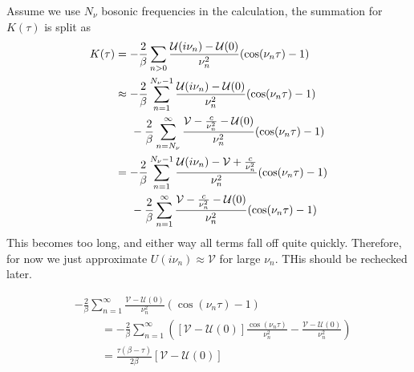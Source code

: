 \documentclass[12pt,a4paper]{scrartcl}
\numberwithin{equation}{section}
\begin{document}
Assume we use $N_{\nu}$ bosonic frequencies in the calculation, the summation for $K(\tau)$ is split as
\begin{align}
K(\tau) &= -\frac{2}{\beta} \sum_{n>0} \frac{\mathcal{U}(i\nu_n)-\mathcal{U}(0)}{\nu^2_n}
                                        ( \cos(\nu_n\tau)-1 ) \\
%
&\approx -\frac{2}{\beta} \sum_{n=1}^{N_{\nu}-1} \frac{\mathcal{U}(i\nu_n)-\mathcal{U}(0)}{\nu^2_n}
                                        ( \cos(\nu_n\tau)-1 ) \nonumber \\
    &\hspace{0.5cm}-\frac{2}{\beta} \sum_{n=N_{\nu}}^{\infty} \frac{\mathcal{V} - \frac{c}{\nu_n^2}-\mathcal{U}(0)}{\nu^2_n}
                                        ( \cos(\nu_n\tau)-1 ) \\
%                                        
&= -\frac{2}{\beta} \sum_{n=1}^{N_{\nu}-1} \frac{\mathcal{U}(i\nu_n)-\mathcal{V}+\frac{c}{\nu_n^2}}{\nu^2_n}
                                        ( \cos(\nu_n\tau)-1 ) \nonumber \\
    &\hspace{0.5cm}-\frac{2}{\beta} \sum_{n=1}^{\infty} \frac{\mathcal{V} - \frac{c}{\nu_n^2}-\mathcal{U}(0)}{\nu^2_n}
                                        ( \cos(\nu_n\tau)-1 ) \label{eq:k_hf_sum_last}
\end{align}
This becomes too long, and either way all terms fall off quite quickly.
Therefore, for now we just approximate $U(i\nu_n)\approx \mathcal{V}$ for large $\nu_n$.
THis should be rechecked later.

\begin{align}
& -\frac{2}{\beta} \sum_{n=1}^{\infty} \frac{\mathcal{V} -\mathcal{U}(0)}{\nu^2_n}
                                        ( \cos(\nu_n\tau)-1 ) \nonumber\\
&\hspace{1cm}=-\frac{2}{\beta} \sum_{n=1}^{\infty}
    \left( 
            [\mathcal{V}-\mathcal{U}(0)] \frac{\cos(\nu_n\tau)}{\nu_n^2}
            -\frac{\mathcal{V}-\mathcal{U}(0)}{\nu_n^2}
    \right) \\
%    
 &\hspace{1cm} = 
\frac{\tau(\beta-\tau)}{2\beta}
          \left[ \mathcal{V}-\mathcal{U}(0) \right]
\end{align}
\end{document}
